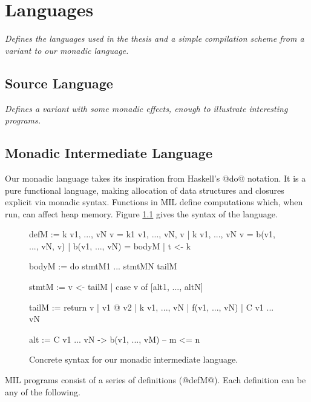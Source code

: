 \documentclass[12pt]{report}
\begin{document}


\chapter{Languages}
\label{ref_chapter_languages}

\emph{Defines the languages used in the thesis and a simple
  compilation scheme from a \lamA variant to our monadic language. }

\section{Source Language}

\emph{Defines a \lamA variant with some monadic effects, enough to
  illustrate interesting programs.}

\section{Monadic Intermediate Language}


Our monadic language takes its inspiration from Haskell's @do@
notation. It is a pure functional language, making allocation of data
structures and closures explicit via monadic syntax. Functions in MIL
define computations which, when run, can affect heap memory. Figure
\ref{figMILDef} gives the syntax of the language.


\begin{figure}[h]
\begin{code}
  defM := k {v1, ..., vN} v = k1 {v1, ..., vN, v} 
    | k {v1, ..., vN} v = b(v1, ..., vN, v)
    | b(v1, ..., vN) = bodyM
    | t <- k {}

  bodyM := do 
    stmtM1 
    ... 
    stmtMN 
    tailM

  stmtM := v <- tailM
    | case v of [alt1, ..., altN]


  tailM := return v
    | v1 @ v2
    | k {v1, ..., vN}
    | f(v1, ..., vN)
    | C v1 ... vN

  alt := C v1 ... vN -> b(v1, ..., vM) -- m <= n
\end{code}
\caption{Concrete syntax for our monadic intermediate language.}
\label{figMILDef}
\end{figure}

MIL programs consist of a series of definitions (@defM@). Each
definition can be any of the following.
\end{document}
